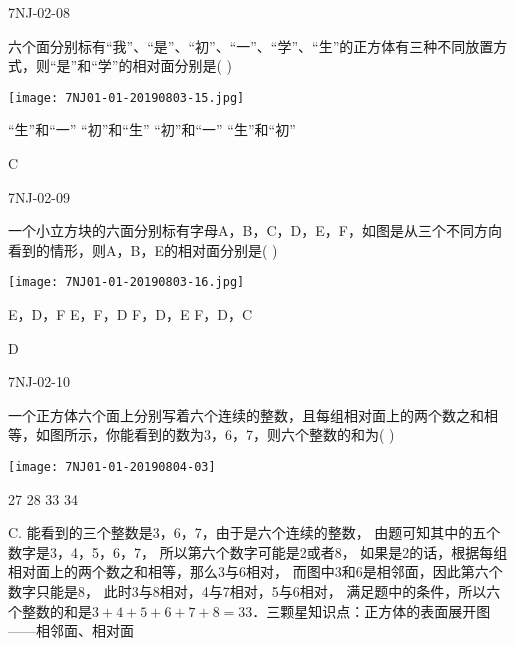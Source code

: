 \begin{defproblem}{7NJ-02-08}%
\begin{onlyproblem}%
六个面分别标有“我”、“是”、“初”、“一”、“学”、“生”的正方体有三种不同放置方式，则“是”和“学”的相对面分别是(    ) 
\begin{center}
\texttt{[image: 7NJ01-01-20190803-15.jpg]}
\end{center}

\xx
{“生”和“一”}
{“初”和“生”}
{“初”和“一”}
{“生”和“初”}   


\end{onlyproblem}%
\begin{onlysolution}%
\begin{solution}%
C
\end{solution}%
\end{onlysolution}%
\end{defproblem}



\begin{defproblem}{7NJ-02-09}%
\begin{onlyproblem}%
一个小立方块的六面分别标有字母A，B，C，D，E，F，如图是从三个不同方向看到的情形，则A，B，E的相对面分别是(    ) 
\begin{center}
\texttt{[image: 7NJ01-01-20190803-16.jpg]}
\end{center}

\xx
{E，D，F}
{E，F，D}
{F，D，E}
{F，D，C}


\end{onlyproblem}%
\begin{onlysolution}%
\begin{solution}%
D
\end{solution}%
\end{onlysolution}%
\end{defproblem}




\begin{defproblem}{7NJ-02-10}%
\begin{onlyproblem}%
一个正方体六个面上分别写着六个连续的整数，且每组相对面上的两个数之和相等，如图所示，你能看到的数为3，6，7，则六个整数的和为(    ) 
\begin{center}
\texttt{[image: 7NJ01-01-20190804-03]}
\end{center}

\xx
{27}
{28}
{33}
{34}

\end{onlyproblem}%
\begin{onlysolution}%
\begin{solution}%
C. 
能看到的三个整数是3，6，7，由于是六个连续的整数， 由题可知其中的五个数字是3，4，5，6，7， 所以第六个数字可能是2或者8， 如果是2的话，根据每组相对面上的两个数之和相等，那么3与6相对， 而图中3和6是相邻面，因此第六个数字只能是8， 此时3与8相对，4与7相对，5与6相对， 满足题中的条件，所以六个整数的和是$3+4+5+6+7+8=33$．三颗星知识点：正方体的表面展开图——相邻面、相对面
\end{solution}%
\end{onlysolution}%
\end{defproblem}






